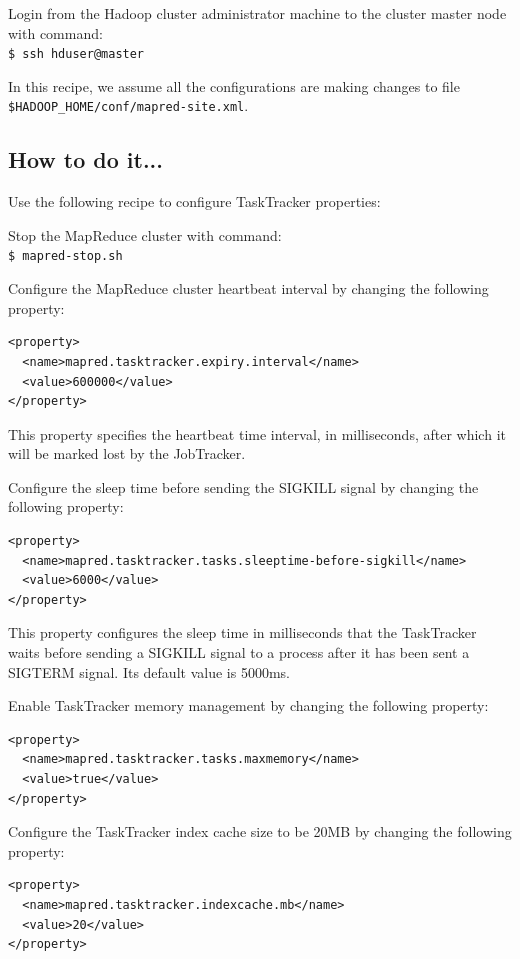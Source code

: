 Login from the Hadoop cluster administrator machine to the cluster master node with command: \\
\verb|$ ssh hduser@master|

In this recipe, we assume all the configurations are making changes to file \verb|$HADOOP_HOME/conf/mapred-site.xml|.
\subsection*{How to do it...}
Use the following recipe to configure TaskTracker properties:

Stop the MapReduce cluster with command: \\
\verb|$ mapred-stop.sh|

Configure the MapReduce cluster heartbeat interval by changing the following property:
\lstset{style=bashstyle}
\begin{lstlisting}
<property>
  <name>mapred.tasktracker.expiry.interval</name>
  <value>600000</value>
</property>
\end{lstlisting}

This property specifies the heartbeat time interval, in milliseconds, after which it will be marked lost by the JobTracker.

Configure the sleep time before sending the SIGKILL signal by changing the following property:
\lstset{style=bashstyle}
\begin{lstlisting}
<property>
  <name>mapred.tasktracker.tasks.sleeptime-before-sigkill</name>
  <value>6000</value>
</property>
\end{lstlisting}

This property configures the sleep time in milliseconds that the TaskTracker waits before sending a SIGKILL signal to a process after it has been sent a SIGTERM signal. Its default value is 5000ms.

Enable TaskTracker memory management by changing the following property:
\lstset{style=bashstyle}
\begin{lstlisting}
<property>
  <name>mapred.tasktracker.tasks.maxmemory</name>
  <value>true</value>
</property>
\end{lstlisting}

Configure the TaskTracker index cache size to be 20MB by changing the following property:
\lstset{style=bashstyle}
\begin{lstlisting}
<property>
  <name>mapred.tasktracker.indexcache.mb</name>
  <value>20</value>
</property>
\end{lstlisting}

